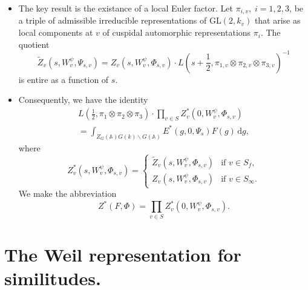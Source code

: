 \documentclass[12pt]{article}
\begin{document}
\begin{itemize}

\item The key result is the existance of a local Euler factor. Let $\pi_{i, v},
\; i = 1, 2, 3$, be a triple of admissible irreducible representations of
$\text{GL}\left(2, k_{v}\right)$ that arise as local components at $v$ of
cuspidal automorphic representations $\pi_{i}$. The quotient 
%
\[\tilde{Z}_{v}\left(s, W_{v}^{\psi}, \Psi_{s, v}\right) = Z_{v}\left(s,
W_{v}^{\psi}, \Phi_{s, v}\right) \cdot L\left(s + \frac{1}{2}, \pi_{1, v}
\otimes \pi_{2, v} \otimes \pi_{3, v}\right)^{-1}\]
%
is entire as a function of $s$.

\item Consequently, we have the identity
%
\begin{multline}L\left(\frac{1}{2}, \pi_{1} \otimes \pi_{2} \otimes
\pi_{3}\right) \cdot \prod_{v \in S}^{}  Z_{v}^{*}\left(0, W_{v}^{\psi},
\Phi_{s, v}\right) \\
= \int_{Z_{G}\left(\mathbb{A}\right) G\left(k\right) \backslash
G\left(\mathbb{A}\right)}^{} E^{*}\left(g, 0, \Psi_{s}\right) F\left(g\right) \,
\mathrm{d}g,\end{multline}
%
where 
%
\[Z_{v}^{*}\left(s, W_{v}^{\psi}, \Phi_{s, v}\right) = \begin{cases}
\tilde{Z}_{v}\left(s, W_{v}^{\psi}, \Phi_{s, v}\right) & \text{if } v \in
S_{f},\\ Z_{v}\left(s, W_{v}^{\psi}, \Phi_{s, v}\right) & \text{if } v \in
S_{\infty}. \end{cases}\]
%
We make the abbreviation 
%
\[Z^{*}\left(F, \Phi\right) = \prod_{v \in S}^{} Z_{v}^{*}\left(0, W_{v}^{\psi},
\Phi_{s, v}\right).\]
%
\end{itemize}

\section{The Weil representation for similitudes.}
\end{document}
